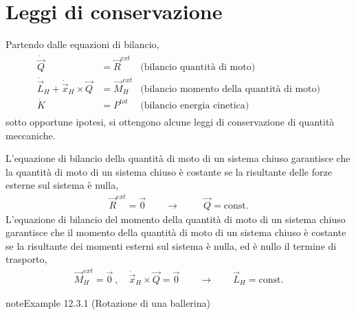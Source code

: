 \documentclass[letterpaper,10pt,italian]{jupyterBook}
\begin{document}
\section{Leggi di conservazione}
\label{\detokenize{ch/mechanics/dynamics-conservation:leggi-di-conservazione}}\label{\detokenize{ch/mechanics/dynamics-conservation:physics-hs-mechanics-dynamics-conservation}}\label{\detokenize{ch/mechanics/dynamics-conservation::doc}}
\sphinxAtStartPar
Partendo dalle equazioni di bilancio,
\begin{equation*}
\begin{split}\begin{aligned}
 \dot{\vec{Q}} & = \vec{R}^{ext} & \text{(bilancio quantità di moto)} \\
 \dot{\vec{L}}_H + \dot{\vec{x}}_H \times \vec{Q} & = \vec{M}_H^{ext} & \text{(bilancio momento della quantità di moto)} \\
 \dot{K} & = P^{tot} & \text{(bilancio energia cinetica)}
\end{aligned}\end{split}
\end{equation*}
\sphinxAtStartPar
sotto opportune ipotesi, si ottengono alcune leggi di conservazione di quantità meccaniche.

\sphinxAtStartPar
{}
L’equazione di bilancio della quantità di moto di un sistema chiuso garantisce che la quantità di moto di un sistema chiuso è costante se la risultante delle forze esterne sul sistema è nulla,
\begin{equation*}
\begin{split}
  \vec{R}^{ext} = \vec{0} \qquad  \rightarrow \qquad \ \ \vec{Q} = \text{const.} 
\end{split}
\end{equation*}
\sphinxAtStartPar
{}
L’equazione di bilancio del momento della quantità di moto di un sistema chiuso garantisce che il momento della quantità di moto di un sistema chiuso è costante se la risultante dei momenti esterni sul sistema è nulla, ed è nullo il termine di trasporto,
\begin{equation*}
\begin{split}
  \vec{M}_H^{ext} = \vec{0} \ , \quad \dot{\vec{x}}_H \times \vec{Q} = \vec{0} \qquad  \rightarrow \qquad \vec{L}_H = \text{const.}
\end{split}
\end{equation*}\label{ch/mechanics/dynamics-conservation:mechanics:dynamics:dancer}
\begin{sphinxadmonition}{note}{Example 12.3.1 (Rotazione di una ballerina)}


\end{sphinxadmonition}
\end{document}
